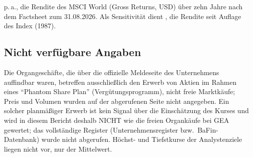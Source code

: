 \Pz{\Huerde} p.\,a., die Rendite des MSCI World (Gross Returns, USD) \"uber zehn Jahre
nach dem Factsheet zum 31.08.2026. Als Sensitivit\"at dient \Pz{\HuerdeLang}, die
Rendite seit Auflage des Index (1987).

\subsection*{Nicht verf\"ugbare Angaben}

Die Organgesch\"afte, die \"uber die offizielle Meldeseite des Unternehmens auffindbar
waren, betreffen ausschlie{\ss}lich den Erwerb von Aktien im Rahmen eines
\enquote{Phantom Share Plan} (Vergütungsprogramm), nicht freie Marktk\"aufe; Preis und
Volumen wurden auf der abgerufenen Seite nicht angegeben. Ein solcher planm\"a{\ss}iger
Erwerb ist kein Signal \"uber die Einsch\"atzung des Kurses und wird in diesem Bericht
deshalb NICHT wie die freien Organk\"aufe bei GEA gewertet; das vollst\"andige Register
(Unternehmensregister bzw.\ BaFin-Datenbank) wurde nicht abgerufen. H\"ochst- und
Tiefstkurse der Analystenziele liegen nicht vor, nur der Mittelwert.
